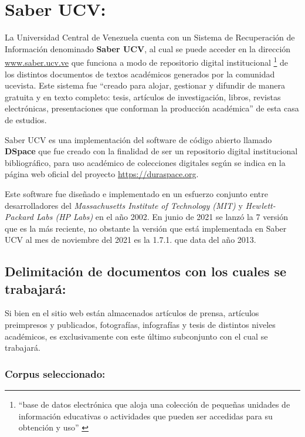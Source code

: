\documentclass[
  10,
  spanish,
  openany]{book}
\begin{document}
\hypertarget{saber}{%
\section{Saber UCV:}\label{saber}}

La Universidad Central de Venezuela cuenta con un Sistema de Recuperación de Información denominado \textbf{Saber UCV}, al cual se puede acceder en la dirección \href{http://saber.ucv.ve/}{www.saber.ucv.ve} que funciona a modo de repositorio digital institucional \footnote{``base de datos electrónica que aloja una colección de pequeñas unidades de información educativas o actividades que pueden ser accedidas para su obtención y uso'' \citep{lehman2007}} de los distintos documentos de textos académicos generados por la comunidad ucevista. Este sistema fue ``creado para alojar, gestionar y difundir de manera gratuita y en texto completo: tesis, artículos de investigación, libros, revistas electrónicas, presentaciones que conforman la producción académica'' de esta casa de estudios.

Saber UCV es una implementación del software de código abierto llamado \textbf{DSpace} que fue creado con la finalidad de ser un repositorio digital institucional bibliográfico, para uso académico de colecciones digitales según se indica en la página web oficial del proyecto \href{https://duraspace.org/dspace/about/}{https://duraspace.org}.

Este software fue diseñado e implementado en un esfuerzo conjunto entre desarrolladores del \emph{Massachusetts Institute of Technology (MIT)} y \emph{Hewlett-Packard Labs (HP Labs)} en el año 2002. En junio de 2021 se lanzó la 7 versión que es la más reciente, no obstante la versión que está implementada en Saber UCV al mes de noviembre del 2021 es la 1.7.1. que data del año 2013.

\hypertarget{delimitaciuxf3n-de-documentos-con-los-cuales-se-trabajaruxe1}{%
\subsection{Delimitación de documentos con los cuales se trabajará:}\label{delimitaciuxf3n-de-documentos-con-los-cuales-se-trabajaruxe1}}

Si bien en el sitio web están almacenados artículos de prensa, artículos preimpresos y publicados, fotografías, infografías y tesis de distintos niveles académicos, es exclusivamente con este último subconjunto con el cual se trabajará.

\hypertarget{corpus}{%
\subsubsection{Corpus seleccionado:}\label{corpus}}
\end{document}
